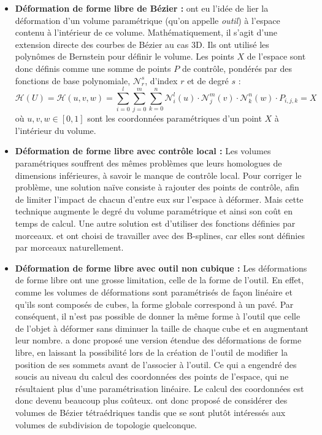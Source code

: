 \begin{itemize}
\item{\textbf{Déformation de forme libre de Bézier :}} \cite{SP86} ont
  eu l'idée de lier la déformation d'un volume paramétrique (qu'on
  appelle \textit{outil}) à l'espace contenu à l'intérieur de ce
  volume. Mathématiquement, il s'agit d'une extension directe des
  courbes de Bézier au cas 3D. Ils ont utilisé les polynômes de
  Bernstein pour définir le volume. Les points $X$ de l'espace sont
  donc définis comme une somme de points $P$ de contrôle, pondérés par
  des fonctions de base polynomiale, $\mathcal{N}_r^s$, d'index $r$ et
  de degré $s$ :
  \begin{equation}
    \mathcal{H}(U) = \mathcal{H}(u,v,w) = 
    \sum_{i=0}^l \sum_{j=0}^m \sum_{k=0}^n
    \mathcal{N}_i^l(u) \cdot \mathcal{N}_j^m(v) \cdot \mathcal{N}_k^n(w) \cdot P_{i,j,k} = X
  \end{equation}
  où $u,v,w \in [0,1]$ sont les coordonnées paramétriques d'un point
  $X$ à l'intérieur du volume.
\item{\textbf{Déformation de forme libre avec contrôle local :}} Les
  volumes paramétriques souffrent des mêmes problèmes que leurs
  homologues de dimensions inférieures, à savoir le manque de contrôle
  local. Pour corriger le problème, une solution naïve consiste à
  rajouter des points de contrôle, afin de limiter l'impact de chacun
  d'entre eux sur l'espace à déformer. Mais cette technique augmente
  le degré du volume paramétrique et ainsi son coût en temps de
  calcul. Une autre solution est d'utiliser des fonctions définies par
  morceaux. \cite{GP89} et \cite{Com89} ont choisi de travailler avec
  des B-splines, car elles sont définies par morceaux naturellement.
\item{\textbf{Déformation de forme libre avec outil non cubique :}}
  Les déformations de forme libre ont une grosse limitation, celle de
  la forme de l'outil. En effet, comme les volumes de déformations
  sont paramétrisés de façon linéaire et qu'ils sont composés de
  cubes, la forme globale correspond à un pavé. Par conséquent, il
  n'est pas possible de donner la même forme à l'outil que celle de
  l'objet à déformer sans diminuer la taille de chaque cube et en
  augmentant leur nombre. \cite{Coq90} a donc proposé une version
  étendue des déformations de forme libre, en laissant la possibilité
  lors de la création de l'outil de modifier la position de ses
  sommets avant de l'associer à l'outil. Ce qui a engendré des soucis
  au niveau du calcul des coordonnées des points de l'espace, qui ne
  résultaient plus d'une paramétrisation linéaire. Le calcul des
  coordonnées est donc devenu beaucoup plus coûteux. \cite{BBT97} ont
  donc proposé de considérer des volumes de Bézier tétraédriques
  tandis que \cite{MJ96} se sont plutôt intéressés aux volumes de
  subdivision de topologie quelconque.
\end{itemize}

